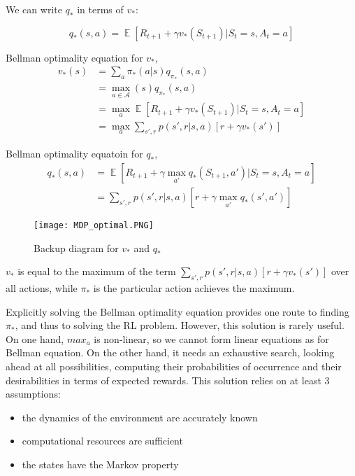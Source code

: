 \documentclass[lang=en,mode=geye,device=normal,color=blue,14pt]{elegantnote}
\DeclareMathOperator*{\E}{\mathbb{E}}
\DeclareMathOperator*{\1}{\mathbbm{1}}
\begin{document}
We can write $q_*$ in terms of $v_*$:

$$ q_*(s,a) = \E [R_{t+1} + \gamma v_* (S_{t+1}) | S_t = s, A_t = a] $$

\begin{definition}
Bellman optimality equation for $v_*$,
\begin{align*}
v_*(s) &= \sum_a \pi_* (a|s) q_{\pi_*} (s,a) \\
& = \max_{a\in\mathcal{A}}(s) q_{\pi_*} (s,a) \\
& = \max_a \E [R_{t+1} + \gamma v_* (S_{t+1}) | S_t = s, A_t = a] \\
& = \max_a \sum_{s',r} p(s',r|s,a)[r+\gamma v_*(s')]
\end{align*}
\end{definition}

\begin{definition}
Bellman optimality equatoin for $q_*$,
\begin{align*}
q_*(s,a) & = \E [R_{t+1} + \gamma \max_{a'} q_*(S_{t+1}, a') | S_t = s, A_t = a] \\
& = \sum_{s',r} p(s',r|s,a)[r+\gamma \max_{a'} q_*(s',a')]
\end{align*}
\end{definition}

\begin{figure}[!h]
  \centering
  \texttt{[image: MDP\_optimal.PNG]}
  \caption{Backup diagram for $v_*$ and $q_*$}
  \label{fig:MDP_optimal}
\end{figure}

$v_*$ is equal to the maximum of the term $\sum_{s',r} p(s',r|s,a)[r+\gamma v_*(s')]$ over all actions, while $\pi_*$ is the particular action achieves the maximum.
\newline

Explicitly solving the Bellman optimality equation provides one route to finding $\pi_*$, and thus to solving the RL problem.
However, this solution is rarely useful.
On one hand, $max_a$ is non-linear, so we cannot form linear equations as for Bellman equation.
On the other hand, it needs an exhaustive search, looking ahead at all possibilities, computing their probabilities of occurrence and their desirabilities in terms of expected rewards.
This solution relies on at least 3 assumptions:
\begin{itemize}
\item the dynamics of the environment are accurately known
\item computational resources are sufficient
\item the states have the Markov property
\end{itemize}
\end{document}
